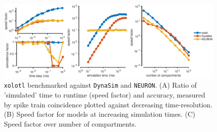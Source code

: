 \documentclass{frontiersSCNS} %
\begin{document}
\begin{figure}
	\centering
	\includegraphics[width=1.0\linewidth]{gfx/figure_benchmark}
	\caption{\texttt{xolotl} benchmarked against \texttt{DynaSim} and \texttt{NEURON}. (A) Ratio of 'simulated' time to runtime (speed factor) and accuracy, measured by spike train coincidence plotted against decreasing time-resolution. (B) Speed factor for models at increasing simulation times. (C) Speed factor over number of compartments.}
	\label{fig:figurebenchmark}
\end{figure}
\end{document}
